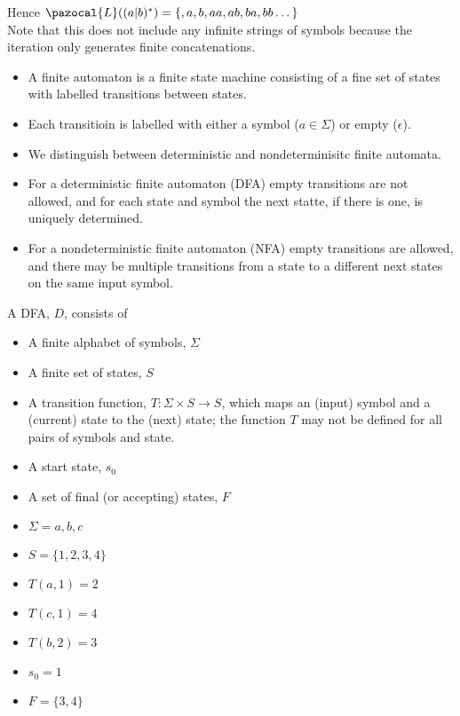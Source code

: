 Hence $\pazocal{L}((a|b)^*) = \{, a, b, aa, ab, ba, bb \dots \}$ \\
Note that this does not include any infinite strings of symbols because the iteration only generates finite concatenations.
\begin{itemize}
    \item A finite automaton is a finite state machine consisting of a fine set of states with labelled transitions between states. 
    \item Each transitioin is labelled with either a symbol ($a \in \Sigma$) or empty ($\epsilon$).
    \item We distinguish between deterministic and nondeterminisitc finite automata.
    \item For a deterministic finite automaton (DFA) empty transitions are not allowed, and for each state and symbol the next statte, if there is one, is uniquely determined. 
    \item For a nondeterministic finite automaton (NFA) empty transitions are allowed, and there may be multiple transitions from a state to a different next states on the same input symbol.
\end{itemize}

A DFA, $D$, consists of
\begin{itemize}
    \item A finite alphabet of symbols, $\Sigma$
    \item A finite set of states, $S$
    \item A transition function, $T : \Sigma \times S \rightarrow S$, which maps an (input) symbol and a (current) state to the (next) state; the function $T$ may not be defined for all pairs of symbols and state. 
    \item A start state, $s_0$ 
    \item A set of final (or accepting) states, $F$
\end{itemize}

\begin{itemize}
    \item $\Sigma = {a,b,c}$
    \item $S = \{1,2,3,4\}$
    \item $T(a, 1) = 2 $
    \item $T(c, 1) = 4$
    \item $T(b, 2) = 3$
    \item $s_0 = 1$
    \item $F = \{3,4\}$
\end{itemize}

